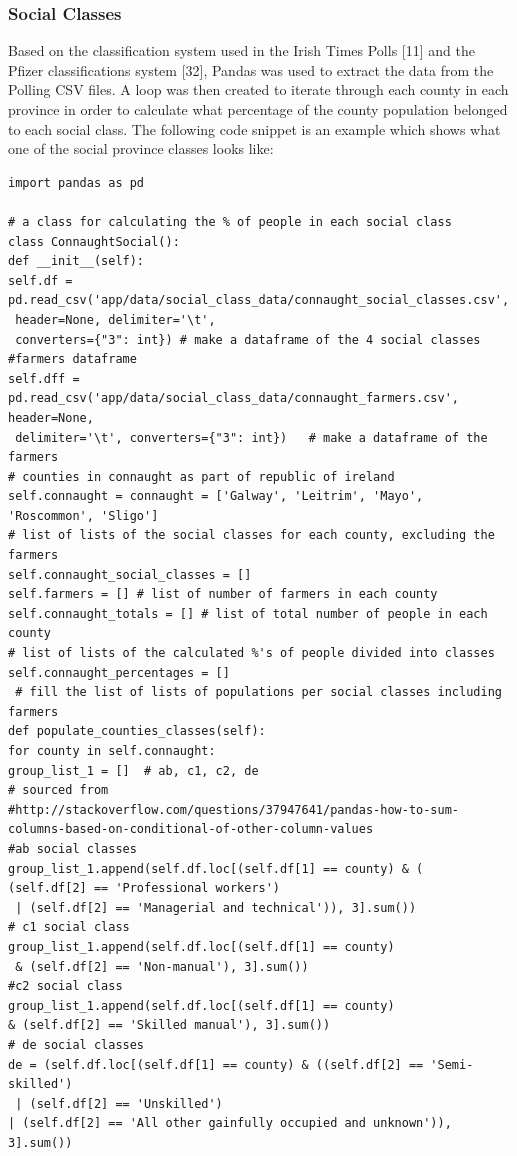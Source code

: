 \subsubsection{Social Classes}
Based on the classification system used in the Irish Times Polls [11] and the Pfizer classifications system [32], Pandas was used to extract the data from the Polling CSV files. A loop was then created to iterate through each county in each province in order to calculate what percentage of the county population belonged to each social class. The following code snippet is an example which shows what one of the social province classes looks like:
\begin{verbatim}
import pandas as pd

# a class for calculating the % of people in each social class
class ConnaughtSocial():
def __init__(self):
self.df = 
pd.read_csv('app/data/social_class_data/connaught_social_classes.csv',
 header=None, delimiter='\t', 
 converters={"3": int}) # make a dataframe of the 4 social classes
#farmers dataframe
self.dff = 
pd.read_csv('app/data/social_class_data/connaught_farmers.csv', header=None,
 delimiter='\t', converters={"3": int})   # make a dataframe of the farmers
# counties in connaught as part of republic of ireland
self.connaught = connaught = ['Galway', 'Leitrim', 'Mayo', 'Roscommon', 'Sligo']
# list of lists of the social classes for each county, excluding the farmers 
self.connaught_social_classes = [] 
self.farmers = [] # list of number of farmers in each county
self.connaught_totals = [] # list of total number of people in each county
# list of lists of the calculated %'s of people divided into classes
self.connaught_percentages = [] 
 # fill the list of lists of populations per social classes including farmers
def populate_counties_classes(self):
for county in self.connaught:
group_list_1 = []  # ab, c1, c2, de
# sourced from  
#http://stackoverflow.com/questions/37947641/pandas-how-to-sum-columns-based-on-conditional-of-other-column-values
#ab social classes
group_list_1.append(self.df.loc[(self.df[1] == county) & (
(self.df[2] == 'Professional workers')
 | (self.df[2] == 'Managerial and technical')), 3].sum())
# c1 social class
group_list_1.append(self.df.loc[(self.df[1] == county)
 & (self.df[2] == 'Non-manual'), 3].sum())
#c2 social class
group_list_1.append(self.df.loc[(self.df[1] == county) 
& (self.df[2] == 'Skilled manual'), 3].sum())
# de social classes
de = (self.df.loc[(self.df[1] == county) & ((self.df[2] == 'Semi-skilled')
 | (self.df[2] == 'Unskilled')
| (self.df[2] == 'All other gainfully occupied and unknown')), 3].sum())


\end{verbatim}
